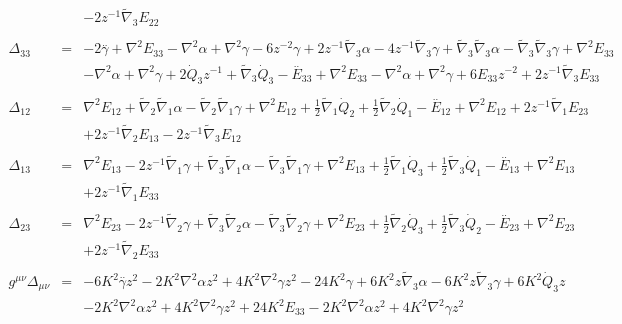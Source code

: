 \documentclass[10pt,letterpaper]{article}
\numberwithin{equation}{section}
\begin{document}
\begin{eqnarray}
&& - 2 z^{-1} \tilde{\nabla}_{3}E_{22}
\\  \nonumber\\ 
\Delta_{33}&=& -2 \overset{..}{\gamma} + \nabla^{2}{}E_{33} -  \nabla^{2}{}\alpha + \nabla^{2}{}\gamma - 6 z^{-2} \gamma + 2 z^{-1} \tilde{\nabla}_{3}\alpha - 4 z^{-1} \tilde{\nabla}_{3}\gamma + \tilde{\nabla}_{3}\tilde{\nabla}_{3}\alpha -  \tilde{\nabla}_{3}\tilde{\nabla}_{3}\gamma +\nabla^{2}{}E_{33} \nonumber \\ 
&& -  \nabla^{2}{}\alpha + \nabla^{2}{}\gamma + 2 \dot{Q}_{3} z^{-1} + \tilde{\nabla}_{3}\dot{Q}_{3}- \overset{..}{E}_{33} + \nabla^{2}{}E_{33} -  \nabla^{2}{}\alpha + \nabla^{2}{}\gamma + 6 E_{33} z^{-2} + 2 z^{-1} \tilde{\nabla}_{3}E_{33}
\\  \nonumber\\ 
\Delta_{12}&=& \nabla^{2}{}E_{12} + \tilde{\nabla}_{2}\tilde{\nabla}_{1}\alpha -  \tilde{\nabla}_{2}\tilde{\nabla}_{1}\gamma +\nabla^{2}{}E_{12} + \tfrac{1}{2} \tilde{\nabla}_{1}\dot{Q}_{2} + \tfrac{1}{2} \tilde{\nabla}_{2}\dot{Q}_{1}- \overset{..}{E}_{12} + \nabla^{2}{}E_{12} + 2 z^{-1} \tilde{\nabla}_{1}E_{23} \nonumber \\ 
&& + 2 z^{-1} \tilde{\nabla}_{2}E_{13} - 2 z^{-1} \tilde{\nabla}_{3}E_{12}
\\  \nonumber\\ 
\Delta_{13}&=& \nabla^{2}{}E_{13} - 2 z^{-1} \tilde{\nabla}_{1}\gamma + \tilde{\nabla}_{3}\tilde{\nabla}_{1}\alpha -  \tilde{\nabla}_{3}\tilde{\nabla}_{1}\gamma +\nabla^{2}{}E_{13} + \tfrac{1}{2} \tilde{\nabla}_{1}\dot{Q}_{3} + \tfrac{1}{2} \tilde{\nabla}_{3}\dot{Q}_{1}- \overset{..}{E}_{13} + \nabla^{2}{}E_{13} \nonumber \\ 
&& + 2 z^{-1} \tilde{\nabla}_{1}E_{33}
\\  \nonumber\\ 
\Delta_{23}&=& \nabla^{2}{}E_{23} - 2 z^{-1} \tilde{\nabla}_{2}\gamma + \tilde{\nabla}_{3}\tilde{\nabla}_{2}\alpha -  \tilde{\nabla}_{3}\tilde{\nabla}_{2}\gamma +\nabla^{2}{}E_{23} + \tfrac{1}{2} \tilde{\nabla}_{2}\dot{Q}_{3} + \tfrac{1}{2} \tilde{\nabla}_{3}\dot{Q}_{2}- \overset{..}{E}_{23} + \nabla^{2}{}E_{23} \nonumber \\ 
&& + 2 z^{-1} \tilde{\nabla}_{2}E_{33}
\\  \nonumber\\ 
g^{\mu\nu}\Delta_{\mu\nu}&=& -6 K^2 \overset{..}{\gamma} z^2 - 2 K^2 \nabla^{2}{}\alpha z^2 + 4 K^2 \nabla^{2}{}\gamma z^2 - 24 K^2 \gamma + 6 K^2 z \tilde{\nabla}_{3}\alpha - 6 K^2 z \tilde{\nabla}_{3}\gamma +6 K^2 \dot{Q}_{3} z \nonumber \\ 
&& - 2 K^2 \nabla^{2}{}\alpha z^2 + 4 K^2 \nabla^{2}{}\gamma z^2+24 K^2 E_{33} - 2 K^2 \nabla^{2}{}\alpha z^2 + 4 K^2 \nabla^{2}{}\gamma z^2
\end{eqnarray}
%
%
\end{document}
